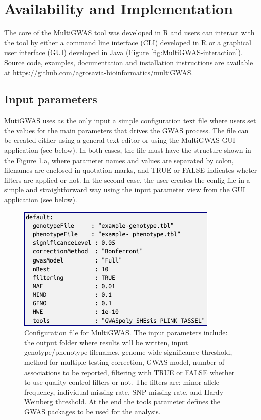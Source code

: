 \documentclass{article}
\begin{document}
\section{Availability and Implementation}

The core of the MultiGWAS tool was developed in R and users can interact
with the tool by either a command line interface (CLI) developed in
R or a graphical user interface (GUI) developed in Java (Figure \ref{fig:MultiGWAS-interaction}).
Source code, examples, documentation and installation instructions
are available at \url{https://github.com/agrosavia-bioinformatics/multiGWAS}. 

\subsection{Input parameters}

MutiGWAS uses as the only input a simple configuration text file where
users set the values for the main parameters that drives the GWAS
process. The file can be created either using a general text editor
or using the MultiGWAS GUI application (see below). In both cases,
the file must have the structure shown in the Figure \ref{fig:Configuration-file}.a,
where parameter names and values are separated by colon, filenames
are enclosed in quotation marks, and TRUE or FALSE indicates wheter
filters are applied or not. In the second case, the user creates the
config file in a simple and straightforward way using the input parameter
view from the GUI application (see below).

\begin{figure}[H]
\begin{centering}
\includegraphics{images/paper-config-file}
\par\end{centering}
\caption{Configuration file for MultiGWAS. The input parameters include: the
output folder where results will be written, input genotype/phenotype
filenames, genome-wide significance threshold, method for multiple
testing correction, GWAS model, number of associations to be reported,
filtering with TRUE or FALSE whether to use quality control filters
or not. The filters are: minor allele frequency, individual missing
rate, SNP missing rate, and Hardy-Weinberg threshold. At the end the
tools parameter defines the GWAS packages to be used for the analysis.
\label{fig:Configuration-file}}
\end{figure}
\end{document}
